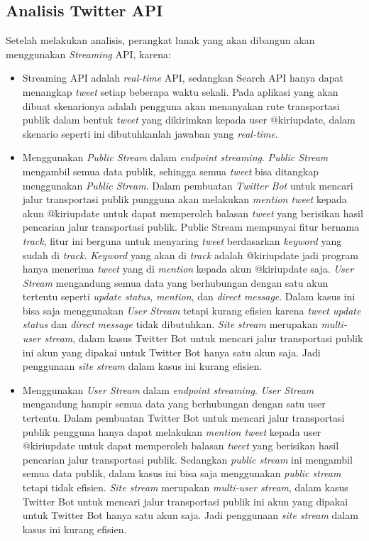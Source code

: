 \subsection{Analisis Twitter API}
Setelah melakukan analisis, perangkat lunak yang akan dibangun akan menggunakan \textit{Streaming} API, karena:
\begin{itemize}
	\item Streaming API adalah \textit{real-time} API, sedangkan Search API hanya dapat menangkap \textit{tweet} setiap beberapa waktu sekali. Pada aplikasi yang akan dibuat skenarionya adalah pengguna akan menanyakan rute transportasi publik dalam bentuk \textit{tweet} yang dikirimkan kepada user @kiriupdate, dalam skenario seperti ini dibutuhkanlah jawaban yang \textit{real-time}.
	\item Menggunakan \textit{Public Stream} dalam \textit{endpoint streaming}. \textit{Public Stream} mengambil semua data publik, sehingga semua \textit{tweet} bisa ditangkap menggunakan \textit{Public Stream}. Dalam pembuatan \textit{Twitter Bot} untuk mencari jalur transportasi publik pungguna akan melakukan \textit{mention tweet} kepada akun @kiriupdate untuk dapat memperoleh balasan \textit{tweet} yang berisikan hasil pencarian jalur transportasi publik. Public Stream mempunyai fitur bernama \textit{track}, fitur ini berguna untuk menyaring \textit{tweet} berdasarkan \textit{keyword} yang sudah di \textit{track}. \textit{Keyword} yang akan di \textit{track} adalah @kiriupdate jadi program hanya menerima \textit{tweet} yang di \textit{mention} kepada akun @kiriupdate saja. \textit{User Stream} mengandung semua data yang berhubungan dengan satu akun tertentu seperti \textit{update status}, \textit{mention}, dan \textit{direct message}. Dalam kasus ini bisa saja menggunakan \textit{User Stream} tetapi kurang efisien karena \textit{tweet update status} dan \textit{direct message} tidak dibutuhkan. \textit{Site stream} merupakan \textit{multi-user stream}, dalam kasus Twitter Bot untuk mencari jalur transportasi publik ini akun yang dipakai untuk Twitter Bot hanya satu akun saja. Jadi penggunaan \textit{site stream} dalam kasus ini kurang efisien.
	
	\item Menggunakan \textit{User Stream} dalam \textit{endpoint streaming}. \textit{User Stream} mengandung hampir semua data yang berhubungan dengan satu user tertentu. Dalam pembuatan Twitter Bot untuk mencari jalur transportasi publik pengguna hanya dapat melakukan \textit{mention tweet} kepada user @kiriupdate untuk dapat memperoleh balasan \textit{tweet} yang berisikan hasil pencarian jalur transportasi publik. Sedangkan \textit{public stream} ini mengambil semua data publik, dalam kasus ini bisa saja menggunakan \textit{public stream} tetapi tidak efisien. \textit{Site stream} merupakan \textit{multi-user stream}, dalam kasus Twitter Bot untuk mencari jalur transportasi publik ini akun yang dipakai untuk Twitter Bot hanya satu akun saja. Jadi penggunaan \textit{site stream} dalam kasus ini kurang efisien.
\end{itemize}

